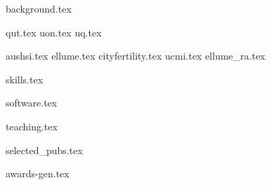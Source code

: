 \documentclass[11pt]{article}
\begin{document}
{background.tex}

{qut.tex}
{uon.tex}
{uq.tex}

\vspace{1mm}
{aushsi.tex}
{ellume.tex}
{cityfertility.tex}
{ucmi.tex}
{ellume_ra.tex}

\vspace{1mm}
{skills.tex}

\vspace{1mm}
{software.tex}

\vspace{1mm}
{teaching.tex}

\vspace{1mm}
\begin{enumerate}
	{selected_pubs.tex}
\end{enumerate}\par

\vspace{1mm}
{awards-gen.tex}
\end{document}
